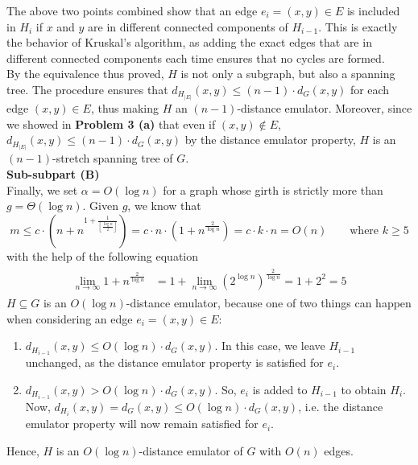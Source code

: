\documentclass[9pt]{article}
\begin{document}
The above two points combined show that an edge $e_{i} = (x, y) \in E$ is included in $H_{i}$
if $x$ and $y$ are in different connected components of $H_{i-1}$. This is exactly the behavior
of Kruskal's algorithm, as adding the exact edges that are in different connected components
each time ensures that no cycles are formed. \\
By the equivalence thus proved, $H$ is not only a subgraph, but also a spanning tree. The
procedure ensures that $d_{H_{|E|}}(x, y) \leq (n - 1) \cdot d_{G}(x, y)$ for each edge
$(x, y) \in E$, thus making $H$ an $(n-1)$-distance emulator. Moreover, since we showed in
\textbf{Problem 3 (a)} that even if $(x, y) \notin E$,
$d_{H_{|E|}}(x, y) \leq (n - 1) \cdot d_{G}(x, y)$ by the distance emulator property, $H$ is
an $(n-1)$-stretch spanning tree of $G$.
\vspace*{10pt} \\
\textbf{Sub-subpart (B)}
\vspace*{5pt} \\
Finally, we set $\alpha = O(\log{n})$ for a graph whose girth is strictly more than
$g = \Theta(\log{n})$. Given $g$, we know that
\begin{equation}
    m \leq c \cdot \left( n + n^{1 + \frac{1}{\left\lfloor \frac{\log{n}}{2} \right\rfloor}} \right)
    = c \cdot n \cdot \left( 1 + n^{\frac{2}{\log{n}}} \right)
    = c \cdot k \cdot n = O(n) \qquad \text{where } k \geq 5
\end{equation}
with the help of the following equation
\begin{align}
    \begin{split}
        \lim_{n \to \infty} 1 + n^{\frac{2}{\log{n}}}
        &= 1 + \lim_{n \to \infty} \left( 2^{\log{n}} \right)^{\frac{2}{\log{n}}} = 1 + 2^{2} = 5
    \end{split}
\end{align}
$H \subseteq G$ is an $O(\log{n})$-distance emulator, because one of two things can happen
when considering an edge $e_{i} = (x, y) \in E$:
\begin{enumerate}
    \item $d_{H_{i-1}}(x, y) \leq O(\log{n}) \cdot d_{G}(x, y)$. In this case, we leave
     $H_{i-1}$ unchanged, as the distance emulator property is satisfied for $e_{i}$.
    \item $d_{H_{i-1}}(x, y) > O(\log{n}) \cdot d_{G}(x, y)$. So, $e_{i}$ is added to
    $H_{i-1}$ to obtain $H_{i}$. Now,
    $d_{H_{i}}(x, y) = d_{G}(x, y) \leq O(\log{n}) \cdot d_{G}(x, y)$, i.e. the distance
    emulator property will now remain satisfied for $e_{i}$.
\end{enumerate}
Hence, $H$ is an $O(\log{n})$-distance emulator of $G$ with $O(n)$ edges.
\end{document}
